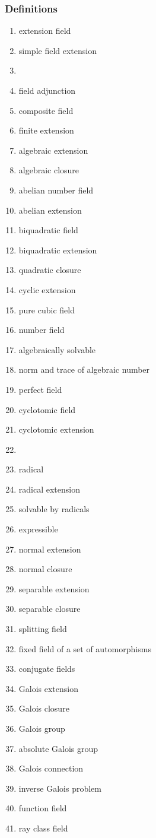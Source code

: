 \documentclass[12pt]{article}
\begin{document}
\subsubsection*{Definitions}
\begin{enumerate}
\item extension field
\item simple field extension
\item {}
\item field adjunction
\item composite field
\item finite extension
\item algebraic extension
\item algebraic closure
\item abelian number field
\item abelian extension
\item biquadratic field
\item biquadratic extension
\item quadratic closure
\item cyclic extension
\item pure cubic field
\item number field
\item algebraically solvable
\item norm and trace of algebraic number
\item perfect field
\item cyclotomic field
\item cyclotomic extension
\item {}
\item radical
\item radical extension
\item solvable by radicals
\item expressible
\item normal extension
\item normal closure
\item separable extension
\item separable closure
\item splitting field
\item fixed field of a set of automorphisms
\item conjugate fields
\item Galois extension
\item Galois closure
\item Galois group
\item absolute Galois group
\item Galois connection
\item inverse Galois problem
\item function field
\item ray class field
\end{enumerate}
\end{document}

